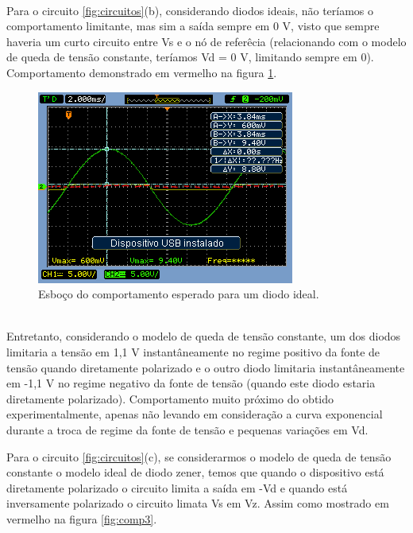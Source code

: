 \documentclass{abntex2}
\begin{document}
\\Para o circuito \ref{fig:circuitos}(b), considerando diodos ideais, não teríamos o comportamento limitante, mas sim a saída sempre em 0 V, visto que sempre haveria um curto circuito entre Vs e o nó de referêcia (relacionando com o modelo de queda de tensão constante, teríamos Vd = 0 V, limitando sempre em 0). Comportamento demonstrado em vermelho na figura \ref{fig:comp2}.

\begin{figure}[h]
  \centering
  \includegraphics[scale = .7]{circuito-1b-esboco.png}
  \caption{Esboço do comportamento esperado para um diodo ideal.}
  \label{fig:comp2}
\end{figure}

\\Entretanto, considerando o modelo de queda de tensão constante, um dos diodos limitaria a tensão em 1,1 V instantâneamente no regime positivo da fonte de tensão quando diretamente polarizado e o outro diodo limitaria instantâneamente em -1,1 V no regime negativo da
fonte de tensão (quando este diodo estaria diretamente polarizado). Comportamento muito próximo do obtido experimentalmente, apenas não levando em consideração a curva exponencial durante a troca de regime da fonte de tensão e pequenas variações em Vd.


Para o circuito \ref{fig:circuitos}(c), se considerarmos o modelo de queda de tensão constante o modelo ideal de diodo zener, temos que quando o dispositivo está diretamente polarizado o circuito limita a saída em -Vd e quando está inversamente polarizado o circuito limata Vs em Vz. Assim como mostrado em vermelho na figura \ref{fig:comp3}.
\end{document}

